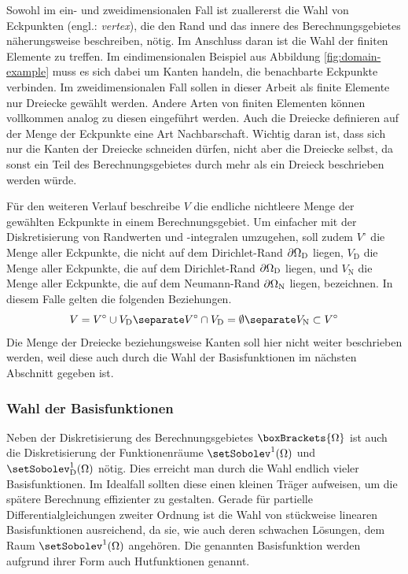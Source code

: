 \documentclass[crop=false]{standalone}
\begin{document}
        Sowohl im ein- und zweidimensionalen Fall ist zuallererst die Wahl von Eckpunkten (engl.: \textit{vertex}), die den Rand und das innere des Berechnungsgebietes näherungsweise beschreiben, nötig.
        Im Anschluss daran ist die Wahl der finiten Elemente zu treffen.
        Im eindimensionalen Beispiel aus Abbildung \ref{fig:domain-example} muss es sich dabei um Kanten handeln, die benachbarte Eckpunkte verbinden.
        Im zweidimensionalen Fall sollen in dieser Arbeit als finite Elemente nur Dreiecke gewählt werden.
        Andere Arten von finiten Elementen können vollkommen analog zu diesen eingeführt werden.
        Auch die Dreiecke definieren auf der Menge der Eckpunkte eine Art Nachbarschaft.
        Wichtig daran ist, dass sich nur die Kanten der Dreiecke schneiden dürfen, nicht aber die Dreiecke selbst, da sonst ein Teil des Berechnungsgebietes durch mehr als ein Dreieck beschrieben werden würde.

        Für den weiteren Verlauf beschreibe $V$ die endliche nichtleere Menge der gewählten Eckpunkte in einem Berechnungsgebiet.
        Um einfacher mit der Diskretisierung von Randwerten und -integralen umzugehen, soll zudem $V^\circ$ die Menge aller Eckpunkte, die nicht auf dem Dirichlet-Rand $\partial\Omega_\mathrm{D}$ liegen, $V_\mathrm{D}$ die Menge aller Eckpunkte, die auf dem Dirichlet-Rand $\partial\Omega_\mathrm{D}$ liegen, und $V_\mathrm{N}$ die Menge aller Eckpunkte, die auf dem Neumann-Rand $\partial\Omega_\mathrm{N}$ liegen, bezeichnen.
        In diesem Falle gelten die folgenden Beziehungen.
        \[
          V = V^\circ \cup V_\mathrm{D}
          \separate
          V^\circ \cap V_\mathrm{D} = \emptyset
          \separate
          V_\mathrm{N} \subset V^\circ
        \]
        Die Menge der Dreiecke beziehungsweise Kanten soll hier nicht weiter beschrieben werden, weil diese auch durch die Wahl der Basisfunktionen im nächsten Abschnitt gegeben ist.

      \subsubsection{Wahl der Basisfunktionen}
        Neben der Diskretisierung des Berechnungsgebietes $\boxBrackets{\domain}$ ist auch die Diskretisierung der Funktionenräume $\setSobolev^1(\domain)$ und $\setSobolev^1_\mathrm{D}(\domain)$ nötig.
        Dies erreicht man durch die Wahl endlich vieler Basisfunktionen.
        Im Idealfall sollten diese einen kleinen Träger aufweisen, um die spätere Berechnung effizienter zu gestalten.
        Gerade für partielle Differentialgleichungen zweiter Ordnung ist die Wahl von stückweise linearen Basisfunktionen ausreichend, da sie, wie auch deren schwachen Lösungen, dem Raum $\setSobolev^1(\Omega)$ angehören.
        Die genannten Basisfunktion werden aufgrund ihrer Form auch Hutfunktionen genannt.
        \cite{Schweizer2013,Alberty1998,Logan2007,Cheney2008,Quarteroni2000}
\end{document}
